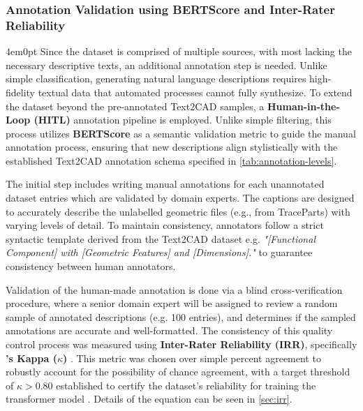 		\subsubsection{Annotation Validation using BERTScore and Inter-Rater Reliability}
			\begin{indentedblock}{4em}{0pt}
				Since the dataset is comprised of multiple sources, with most lacking the necessary descriptive texts, an additional annotation step is needed. Unlike simple classification, generating natural language descriptions requires high-fidelity textual data that automated processes cannot fully synthesize. To extend the dataset beyond the pre-annotated Text2CAD samples, a \textbf{Human-in-the-Loop (HITL)} annotation pipeline is employed. Unlike simple filtering, this process utilizes \textbf{BERTScore} \parencite{bertscore_zhang} as a semantic validation metric to guide the manual annotation process, ensuring that new descriptions align stylistically with the established Text2CAD annotation schema specified in \autoref{tab:annotation-levels}.
			
			
				The initial step includes writing manual annotations for each unannotated dataset entries which are validated by domain experts. The captions are designed to accurately describe the unlabelled geometric files (e.g., from TraceParts) with varying levels of detail. To maintain consistency, annotators follow a strict syntactic template derived from the Text2CAD dataset e.g. \textit{"[Functional Component] with [Geometric Features] and [Dimensions]."} to guarantee consistency between human annotators.  
				
				
				Validation of the human-made annotation is done via a blind cross-verification procedure, where a senior domain expert will be assigned to review a random sample of annotated descriptions (e.g. 100 entries), and determines if the sampled annotations are accurate and well-formatted. The consistency of this quality control process was measured using \textbf{Inter-Rater Reliability (IRR)}, specifically \textbf{'s Kappa ($\kappa$)} \parencite{kappa_cohen}. This metric was chosen over simple percent agreement to robustly account for the possibility of chance agreement, with a target threshold of $\kappa > 0.80$ established to certify the dataset's reliability for training the transformer model \parencite{kappa_landis}. Details of the equation can be seen in \autoref{sec:irr}.
			\end{indentedblock}
			
